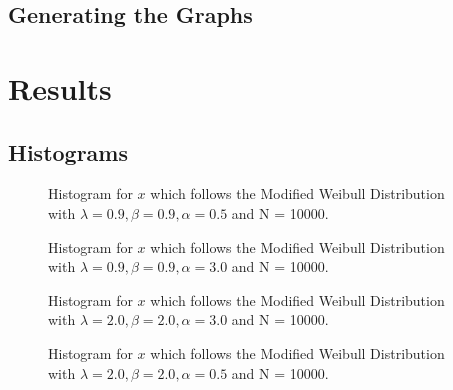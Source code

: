 \documentclass[11pt]{article}
\numberwithin{equation}{section}
\begin{document}


\pagebreak

\subsection{Generating the Graphs}
\medskip



\pagebreak

\section{Results}
\subsection{Histograms}

\begin{figure}[H]
	\centering
	\caption{Histogram for $x$ which follows the Modified Weibull Distribution with $\lambda = 0.9, \beta = 0.9, \alpha = 0.5$ and N = 10000.}
	\label{fig:hist1}
\end{figure}
\medskip

\begin{figure}[H]
	\centering
	\caption{Histogram for $x$ which follows the Modified Weibull Distribution with $\lambda = 0.9, \beta = 0.9, \alpha = 3.0$ and N = 10000.}
	\label{fig:hist2}
\end{figure}
\medskip

\begin{figure}[H]
	\centering
	\caption{Histogram for $x$ which follows the Modified Weibull Distribution with $\lambda = 2.0, \beta = 2.0, \alpha = 3.0$ and N = 10000.}
	\label{fig:hist3}
\end{figure}
\medskip

\begin{figure}[H]
	\centering
	\caption{Histogram for $x$ which follows the Modified Weibull Distribution with $\lambda = 2.0, \beta = 2.0, \alpha = 0.5$ and N = 10000.}
	\label{fig:hist4}
\end{figure}
\medskip
\end{document}
